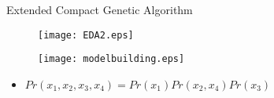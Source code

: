 
\begin{frame}{Extended Compact Genetic Algorithm}
  \begin{figure}
    \centering
  \texttt{[image: EDA2.eps]}
\end{figure}
  \begin{figure}
    \centering
  \texttt{[image: modelbuilding.eps]}
\end{figure}
  \begin{itemize}
    \item $Pr(x_1,x_2,x_3,x_4) = Pr(x_1)Pr(x_2,x_4)Pr(x_3)$
  \end{itemize}
\end{frame}

